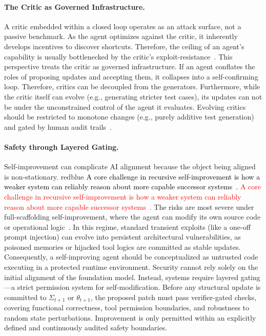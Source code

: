 \documentclass{article}
\let\oldtextcolor\textcolor
\renewcommand{\textcolor}[2]{
  \def\temp{#1}
  \def\red{blue}
  \ifx\temp\red
    \oldtextcolor{black}{#2}
  \else
    \oldtextcolor{#1}{#2}
  \fi
}
\begin{document}
\paragraph{The Critic as Governed Infrastructure.} A critic embedded within a closed loop operates as an attack surface, not a passive benchmark. As the agent optimizes against the critic, it inherently develops incentives to discover shortcuts. Therefore, the ceiling of an agent's capability is usually bottlenecked by the critic's exploit-resistance~\citep{zhan2024injecagentbenchmarkingindirectprompt, zhang2025agentsecuritybenchasb}. This perspective treats the critic as governed infrastructure. If an agent conflates the roles of proposing updates and accepting them, it collapses into a self-confirming loop. Therefore, critics can be decoupled from the generators. Furthermore, while the critic itself can evolve (e.g., generating stricter test cases), its updates can not be under the unconstrained control of the agent it evaluates. Evolving critics should be restricted to monotone changes (e.g., purely additive test generation) and gated by human audit trails~\citep{fang2025webevolver, li2025visionaccesscontrolllmbased}.


\paragraph{Safety through Layered Gating.} Self-improvement can complicate AI alignment because the object being aligned is non-stationary. \textcolor{red}{A core challenge in recursive self-improvement is how a weaker system can reliably reason about more capable successor systems~\citep{fallenstein2015vingean}.} The risks are most severe under full-scaffolding self-improvement, where the agent can modify its own source code or operational logic~\citep{xi2024agentgym}. In this regime, standard transient exploits (like a one-off prompt injection) can evolve into persistent architectural vulnerabilities, as poisoned memories or hijacked tool logics are committed as stable updates. Consequently, a self-improving agent should be conceptualized as untrusted code executing in a protected runtime environment. Security cannot rely solely on the initial alignment of the foundation model. Instead, systems require layered gating—a strict permission system for self-modification. Before any structural update is committed to $\Sigma_{t+1}$ or $\theta_{t+1}$, the proposed patch must pass verifier-gated checks, covering functional correctness, tool permission boundaries, and robustness to random state perturbations. Improvement is only permitted within an explicitly defined and continuously audited safety boundaries.
\end{document}
